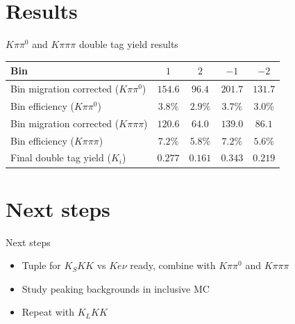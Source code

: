 \documentclass{beamer}
\begin{document}
\section{Results}
\begin{frame}{$K\pi\pi^0$ and $K\pi\pi\pi$ double tag yield results}
  \centering
  \def\arraystretch{1.2}%
  \begin{tabular}{l|cccc}
    \hline
    Bin & $1$    & $2$    & $-1$   & $-2$ \\
    \hline
    Bin migration corrected ($K\pi\pi^0$)  & $154.6$ & $96.4$  & $201.7$ & $131.7$ \\
    Bin efficiency ($K\pi\pi^0$)           & $3.8\%$ & $2.9\%$ & $3.7\%$ & $3.0\%$ \\
    Bin migration corrected ($K\pi\pi\pi$) & $120.6$ & $64.0$  & $139.0$ & $86.1$ \\
    Bin efficiency ($K\pi\pi\pi$)          & $7.2\%$ & $5.8\%$ & $7.2\%$ & $5.6\%$ \\
    Final double tag yield ($K_i$)         & $0.277$ & $0.161$ & $0.343$ & $0.219$ \\
    \hline
  \end{tabular}
\end{frame}

\section{Next steps}
\begin{frame}{Next steps}
  \begin{itemize}
    \setlength\itemsep{2em}
    \item{Tuple for $K_SKK$ vs $Ke\nu$ ready, combine with $K\pi\pi^0$ and $K\pi\pi\pi$}
    \item{Study peaking backgrounds in inclusive MC}
    \item{Repeat with $K_LKK$}
  \end{itemize}
\end{frame}
\end{document}
